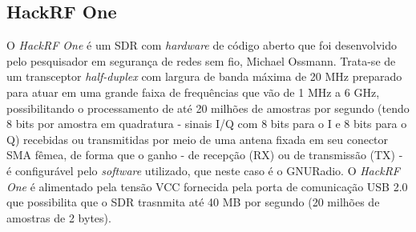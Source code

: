 \documentclass[
  12pt,				%
  openright,			%
  twoside,			%
  a4paper,			%
  english,			%
  french,				%
  spanish,			%
  brazil,				%
  ]{abntex2}
\begin{document}











\subsection*{HackRF One}


O \textit{HackRF One} é um SDR com \textit{hardware} de código aberto que foi desenvolvido pelo pesquisador em segurança de redes sem fio, Michael Ossmann. Trata-se de um transceptor \textit{half-duplex}
com largura de banda máxima de 20 MHz preparado para atuar em uma grande faixa de frequências que vão de 1 MHz a 6 GHz, possibilitando o processamento de até 20 milhões de amostras por
segundo (tendo 8 bits por amostra em quadratura - sinais I/Q com 8 bits para o I e 8 bits para o Q) recebidas ou transmitidas por meio de uma antena fixada em seu conector SMA fêmea, de
forma que o ganho - de recepção (RX) ou de transmissão (TX) - é configurável pelo \textit{software} utilizado, que neste caso é o GNURadio. O \textit{HackRF One} é alimentado pela tensão VCC fornecida
pela porta de comunicação USB 2.0 que possibilita que o SDR trasnmita até 40 MB por segundo (20 milhões de amostras de 2 bytes).
\end{document}
